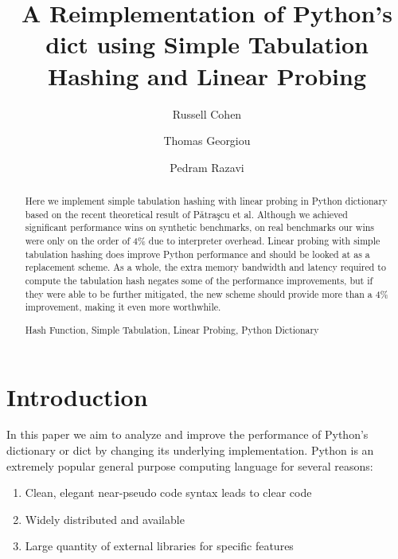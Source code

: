 \documentclass[runningheads,a4paper]{llncs}
\newcommand{\keywords}[1]{\par\addvspace\baselineskip
\noindent\keywordname\enspace\ignorespaces#1}
\begin{document}
\mainmatter  %

\title{A Reimplementation of Python's dict using Simple Tabulation Hashing and Linear Probing}


\author{Russell Cohen\and Thomas Georgiou\and Pedram Razavi}
%


\maketitle


\begin{abstract}
Here we implement simple tabulation hashing with linear probing in Python
dictionary based on the recent theoretical result of P\v{a}tra\c{s}cu et al. Although
we achieved significant performance wins on synthetic benchmarks, on real
benchmarks our wins were only on the order of 4\% due to interpreter overhead.
Linear probing with simple tabulation hashing does improve Python performance
and should be looked at as a replacement scheme.  As a whole, the
extra memory bandwidth
and latency required to compute the tabulation hash negates some of the
performance improvements, but if they were able to be further mitigated, the new scheme
should provide more than a 4\% improvement, making it even more worthwhile.
\keywords{Hash Function, Simple Tabulation, Linear Probing, Python Dictionary}
\end{abstract}


\section{Introduction}
In this paper we aim to analyze and improve the performance of Python's
dictionary or dict by changing its underlying implementation.  Python \cite{python} is an extremely popular general purpose computing language for several reasons:
\begin{enumerate}
 \item Clean, elegant near-pseudo code syntax leads to clear code 
 \item Widely distributed and available
 \item Large quantity of external libraries for specific features 
\end{enumerate}
\end{document}
